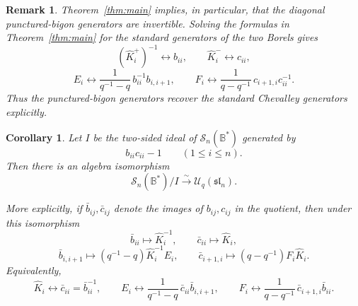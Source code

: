 \documentclass[11pt]{article}
\newtheorem{corollary}[theorem]{Corollary}
\newtheorem{remark}[theorem]{Remark}
\newcommand{\Uc}{\mathcal U}
\newcommand{\bcS}{\mathcal S}
\newcommand{\fB}{\mathbb B}
\begin{document}
\begin{remark}\label{rem:inverse}
Theorem~\ref{thm:main} implies, in particular, that the diagonal punctured-bigon generators are invertible. Solving the formulas in Theorem~\ref{thm:main} for the standard generators of the two Borels gives
\[
(\hat K_i^+)^{-1}\longleftrightarrow b_{ii},\qquad
\hat K_i^-\longleftrightarrow c_{ii},
\]
\[
E_i\longleftrightarrow \frac{1}{q^{-1}-q}\,b_{ii}^{-1}b_{i,i+1},
\qquad
F_i\longleftrightarrow \frac{1}{q-q^{-1}}\,c_{i+1,i}c_{ii}^{-1}.
\]
Thus the punctured-bigon generators recover the standard Chevalley generators explicitly.
\end{remark}

\begin{corollary}\label{cor:quotient}
Let \(I\) be the two-sided ideal of \(\bcS_n(\fB^\ast)\) generated by
\[
b_{ii}c_{ii}-1\qquad (1\le i\le n).
\]
Then there is an algebra isomorphism
\[
\bcS_n(\fB^\ast)/I \xrightarrow{\sim} \Uc_q(\mathfrak{sl}_n).
\]

More explicitly, if \(\bar b_{ij},\bar c_{ij}\) denote the images of \(b_{ij},c_{ij}\) in the quotient, then under this isomorphism
\[
\bar b_{ii}\longmapsto \hat K_i^{-1},\qquad
\bar c_{ii}\longmapsto \hat K_i,
\]
\[
\bar b_{i,i+1}\longmapsto (q^{-1}-q)\hat K_i^{-1}E_i,\qquad
\bar c_{i+1,i}\longmapsto (q-q^{-1})F_i\hat K_i.
\]
Equivalently,
\[
\hat K_i \longleftrightarrow \bar c_{ii}=\bar b_{ii}^{-1},
\qquad
E_i \longleftrightarrow \frac{1}{q^{-1}-q}\,\bar c_{ii}\bar b_{i,i+1},
\qquad
F_i \longleftrightarrow \frac{1}{q-q^{-1}}\,\bar c_{i+1,i}\bar b_{ii}.
\]
\end{corollary}
\end{document}
